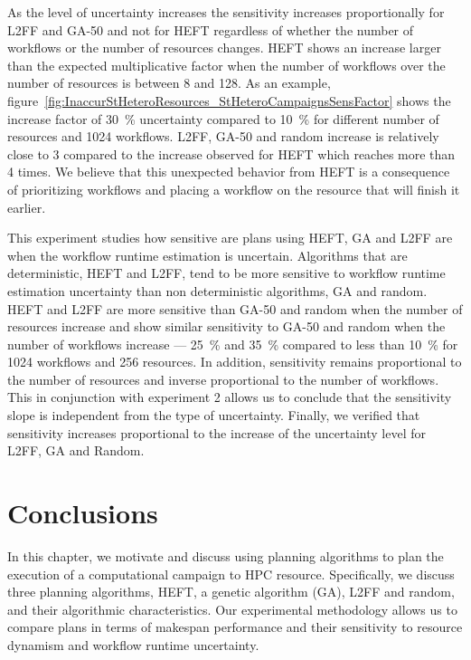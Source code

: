As the level of uncertainty increases the sensitivity increases proportionally for L2FF and GA-50 and not for HEFT regardless of whether the number of workflows or the number of resources changes.
HEFT shows an increase larger than the expected multiplicative factor when the number of workflows over the number of resources is between 8 and 128.
As an example, figure~\ref{fig:InaccurStHeteroResources_StHeteroCampaignsSensFactor} shows the increase factor of 30~\% uncertainty compared to 10~\% for different number of resources and 1024 workflows.
L2FF, GA-50 and random increase is relatively close to 3 compared to the increase observed for HEFT which reaches more than 4 times.
We believe that this unexpected behavior from HEFT is a consequence of prioritizing workflows and placing a workflow on the resource that will finish it earlier.

This experiment studies how sensitive are plans using HEFT, GA and L2FF are when the workflow runtime estimation is uncertain.
Algorithms that are deterministic, HEFT and L2FF, tend to be more sensitive to workflow runtime estimation uncertainty than non deterministic algorithms, GA and random.
HEFT and L2FF are more sensitive than GA-50 and random when the number of resources increase and show similar sensitivity to GA-50 and random when the number of workflows increase --- 25~\% and 35~\% compared to less than 10~\% for 1024 workflows and 256 resources.
In addition, sensitivity remains proportional to the number of resources and inverse proportional to the number of workflows.
This in conjunction with experiment 2 allows us to conclude that the sensitivity slope is independent from the type of uncertainty.
Finally, we verified that sensitivity increases proportional to the increase of the uncertainty level for L2FF, GA and Random.


\section{Conclusions}
\label{sec:cf_algo_sel}
In this chapter, we motivate and discuss using planning algorithms to plan the execution of a computational campaign to HPC resource.
Specifically, we discuss three planning algorithms, HEFT, a genetic algorithm (GA), L2FF and random, and their algorithmic characteristics.
Our experimental methodology allows us to compare plans in terms of makespan performance and their sensitivity to resource dynamism and workflow runtime uncertainty.

